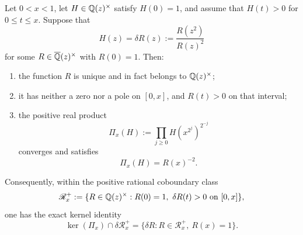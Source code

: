 \begin{proposition}
\label{prop:rational-mahler-certificate}
Let \(0<x<1\), let \(H\in\mathbb{Q}(z)^\times\) satisfy \(H(0)=1\), and assume
that \(H(t)>0\) for \(0\le t\le x\).  Suppose that
\begin{equation}\label{eq:rational-mahler-coboundary}
 H(z)=\delta R(z):=\frac{R(z^2)}{R(z)^2}
\end{equation}
for some \(R\in\overline{\mathbb{Q}}(z)^\times\) with \(R(0)=1\).  Then:
\begin{enumerate}[label=\textup{(\roman*)},leftmargin=*]
 \item the function \(R\) is unique and in fact belongs to
   \(\mathbb{Q}(z)^\times\);
 \item it has neither a zero nor a pole on \([0,x]\), and \(R(t)>0\) on
   that interval;
 \item the positive real product
   \begin{equation}\label{eq:rational-mahler-product}
    \Pi_x(H):=\prod_{j\ge0}H(x^{2^j})^{2^{-j}}
   \end{equation}
   converges and satisfies
   \begin{equation}\label{eq:rational-mahler-telescope}
    \Pi_x(H)=R(x)^{-2}.
   \end{equation}
\end{enumerate}
Consequently, within the positive rational coboundary class
\[
 \mathscr R_x^+:=\{R\in\mathbb{Q}(z)^\times:R(0)=1,
                         \ \delta R(t)>0\text{ on }[0,x]\},
\]
one has the exact kernel identity
\begin{equation}\label{eq:positive-rational-certificate-kernel}
 \ker(\Pi_x)\cap\delta\mathscr R_x^+
 =\{\delta R:R\in\mathscr R_x^+,\ R(x)=1\}.
\end{equation}
\end{proposition}

